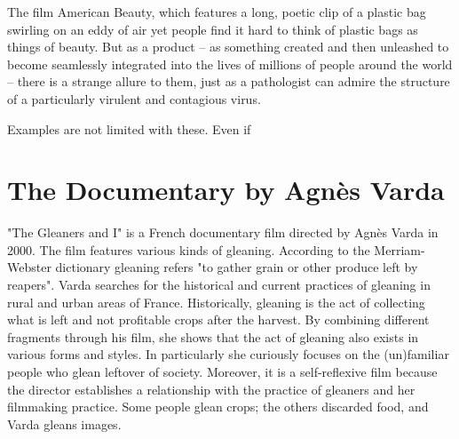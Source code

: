 
The film American Beauty, which features a long, poetic clip of a plastic bag swirling on an eddy of air yet people find it hard to think of plastic bags as things of beauty. But as a product -- as something created and then unleashed to become seamlessly integrated into the lives of millions of people around the world -- there is a strange allure to them, just as a pathologist can admire the structure of a particularly virulent and contagious virus.

Examples are not limited with these. Even if 





%
%
\section{The Documentary  by Agnès Varda}
"The Gleaners and I" is a French documentary film directed by Agnès Varda in 2000. The film features various kinds of gleaning. According to the Merriam-Webster dictionary gleaning refers "to gather grain or other produce left by reapers". Varda searches for the historical and current practices of gleaning in rural and urban areas of France. Historically, gleaning is the act of collecting what is left and not profitable crops after the harvest. By combining different fragments through his film, she shows that the act of gleaning also exists in various forms and styles. In particularly she curiously focuses on the (un)familiar people who glean leftover of society. Moreover, it is a self-reflexive film because the director establishes a relationship with the practice of gleaners and her filmmaking practice. Some people glean crops; the others discarded food, and Varda gleans images.

